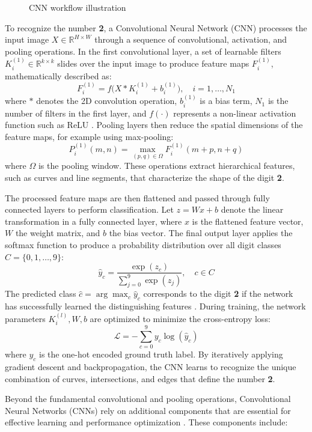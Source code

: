 \begin{figure}[htbp]
	\centering
	
	\caption{CNN workflow illustration}
\end{figure}

To recognize the number \textbf{2}, a Convolutional Neural Network (CNN) processes the input image \(X \in \mathbb{R}^{H \times W}\) through a sequence of convolutional, activation, and pooling operations. In the first convolutional layer, a set of learnable filters \(K^{(1)}_i \in \mathbb{R}^{k \times k}\) slides over the input image to produce feature maps \(F^{(1)}_i\), mathematically described as:
\[
F^{(1)}_i = f\Big(X * K^{(1)}_i + b^{(1)}_i\Big), \quad i = 1, \dots, N_1
\]
where \(*\) denotes the 2D convolution operation, \(b^{(1)}_i\) is a bias term, \(N_1\) is the number of filters in the first layer, and \(f(\cdot)\) represents a non-linear activation function such as ReLU \cite{goodfellow2016deep, pytorchdocs}. Pooling layers then reduce the spatial dimensions of the feature maps, for example using max-pooling:
\[
P^{(1)}_i(m,n) = \max_{(p,q) \in \Omega} F^{(1)}_i(m+p, n+q)
\]
where \(\Omega\) is the pooling window. These operations extract hierarchical features, such as curves and line segments, that characterize the shape of the digit \textbf{2}.

The processed feature maps are then flattened and passed through fully connected layers to perform classification. Let \(z = W x + b\) denote the linear transformation in a fully connected layer, where \(x\) is the flattened feature vector, \(W\) the weight matrix, and \(b\) the bias vector. The final output layer applies the softmax function to produce a probability distribution over all digit classes \(C = \{0,1,\dots,9\}\):
\[
\hat{y}_c = \frac{\exp(z_c)}{\sum_{j=0}^{9} \exp(z_j)}, \quad c \in C
\]
The predicted class \(\hat{c} = \arg\max_c \hat{y}_c\) corresponds to the digit \textbf{2} if the network has successfully learned the distinguishing features \cite{pinto2022springer, pytorchdocs}. During training, the network parameters \(K_i^{(l)}, W, b\) are optimized to minimize the cross-entropy loss:
\[
\mathcal{L} = - \sum_{c=0}^{9} y_c \log(\hat{y}_c)
\]
where \(y_c\) is the one-hot encoded ground truth label. By iteratively applying gradient descent and backpropagation, the CNN learns to recognize the unique combination of curves, intersections, and edges that define the number \textbf{2}.


Beyond the fundamental convolutional and pooling operations, Convolutional Neural Networks (CNNs) rely on additional components that are essential for effective learning and performance optimization \cite{pinto2022springer}. These components include:

